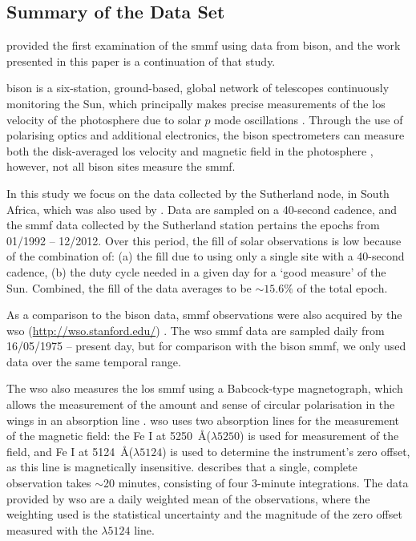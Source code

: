 \subsection{Summary of the Data Set}

\citet{chaplin_studies_2003} provided the first examination of the \gls{smmf} using data from \gls{bison}, and the work presented in this paper is a continuation of that study.

\gls{bison} is a six-station, ground-based, global network of telescopes continuously monitoring the Sun, which principally makes precise measurements of the \gls{los} velocity of the photosphere due to solar $p$ mode oscillations \citep{hale_performance_2016}. Through the use of polarising optics and additional electronics, the \gls{bison} spectrometers can measure both the disk-averaged \gls{los} velocity and magnetic field in the photosphere \citep{chaplin_studies_2003}, however, not all \gls{bison} sites measure the \gls{smmf}. %

In this study we focus on the data collected by the Sutherland node, in South Africa, which was also used by \cite{chaplin_studies_2003}. Data are sampled on a 40-second cadence, and the \gls{smmf} data collected by the Sutherland station pertains the epochs from 01/1992 -- 12/2012. Over this period, the fill of solar observations is low because of the combination of: (a) the fill due to using only a single site with a 40-second cadence, (b) the duty cycle needed in a given day for a `good measure' of the Sun. Combined, the fill of the data averages to be $\sim 15.6\%$ of the total epoch.

As a comparison to the \gls{bison} data, \gls{smmf} observations were also acquired by the \gls{wso} (\url{http://wso.stanford.edu/}) \citep{scherrer_mean_1977-1}. The \gls{wso} \gls{smmf} data are sampled daily from 16/05/1975 -- present day, but for comparison with the \gls{bison} \gls{smmf}, we only used data over the same temporal range.

The \gls{wso} also measures the \gls{los} \gls{smmf} using a Babcock-type magnetograph, which allows the measurement of the amount and sense of circular polarisation in the wings in an absorption line \citep{scherrer_mean_1977}. \gls{wso} uses two absorption lines for the measurement of the magnetic field: the Fe I at 5250~\AA ($\lambda 5250$) is used for measurement of the field, and Fe I at 5124~\AA ($\lambda 5124$) is used to determine the instrument's zero offset, as this line is magnetically insensitive. \cite{scherrer_mean_1977} describes that a single, complete observation takes $\sim$20 minutes, consisting of four 3-minute integrations. The data provided by \gls{wso} are a daily weighted mean of the observations, where the weighting used is the statistical uncertainty and the magnitude of the zero offset measured with the $\lambda 5124$ line.


